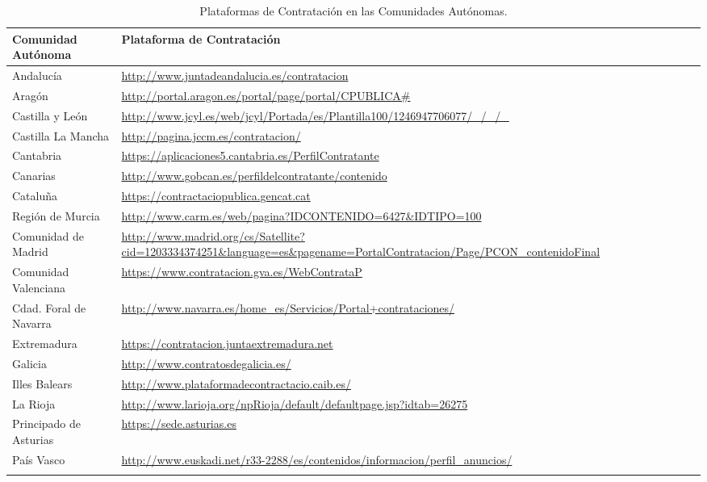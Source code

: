\begin{longtable}[c]{|p{7cm}|p{8cm}|} 
\hline
  \textbf{Comunidad Autónoma} & \textbf{Plataforma de Contratación} \\\hline
\endhead
Andalucía & \url{http://www.juntadeandalucia.es/contratacion} \\ \hline
Aragón & \url{http://portal.aragon.es/portal/page/portal/CPUBLICA#} \\ \hline
Castilla y León & \url{http://www.jcyl.es/web/jcyl/Portada/es/Plantilla100/1246947706077/_/_/_} \\ \hline
Castilla La Mancha & \url{http://pagina.jccm.es/contratacion/} \\ \hline
Cantabria  & \url{https://aplicaciones5.cantabria.es/PerfilContratante} \\ \hline
Canarias & \url{http://www.gobcan.es/perfildelcontratante/contenido} \\ \hline
Cataluña & \url{https://contractaciopublica.gencat.cat} \\ \hline
Región de Murcia & \url{http://www.carm.es/web/pagina?IDCONTENIDO=6427&IDTIPO=100} \\ \hline
Comunidad de Madrid & \url{http://www.madrid.org/cs/Satellite?cid=1203334374251&language=es&pagename=PortalContratacion/Page/PCON_contenidoFinal} \\ \hline
Comunidad Valenciana & \url{https://www.contratacion.gva.es/WebContrataP} \\ \hline
Cdad. Foral de Navarra & \url{http://www.navarra.es/home_es/Servicios/Portal+contrataciones/} \\ \hline
Extremadura & \url{https://contratacion.juntaextremadura.net} \\ \hline
Galicia & \url{http://www.contratosdegalicia.es/} \\ \hline
Illes Balears & \url{http://www.plataformadecontractacio.caib.es/} \\ \hline
La Rioja & \url{http://www.larioja.org/npRioja/default/defaultpage.jsp?idtab=26275} \\ \hline
Principado de Asturias & \url{https://sede.asturias.es} \\ \hline
País Vasco & \url{http://www.euskadi.net/r33-2288/es/contenidos/informacion/perfil_anuncios/} \\ \hline
 \hline
\caption{Plataformas de Contratación en las Comunidades Autónomas.}\label{table:plataformas}\\    
\end{longtable}

